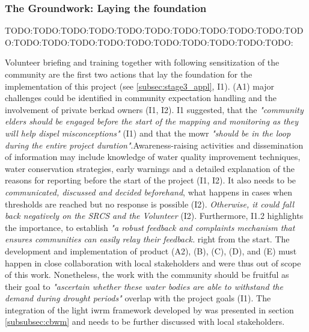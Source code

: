 \subsubsection{The Groundwork: Laying the foundation}
TODO:TODO:TODO:TODO:TODO:TODO:TODO:TODO:TODO:TODO:TODO:TODO:TODO:TODO:TODO:TODO:TODO:TODO:TODO:TODO:TODO:

Volunteer briefing and training together with following sensitization of the community are the first two actions that lay the foundation for the implementation of this project (see \ref*{subsec:stage3_appl}, I1). (A1) major challenges could be identified in community expectation handling and the involvement of private berkad owners (I1, I2). I1 suggested, that the \textit{"community elders should be engaged before the start of the mapping and monitoring as they will help dispel misconceptions"} (I1) and that the \acrshort{mowr} \textit{"should be in the loop during the entire project duration"}.Awareness-raising activities and dissemination of information may include knowledge of water quality improvement techniques, water conservation strategies, early warnings and a detailed explanation of the reasons for reporting before the start of the project (I1, I2). It also needs to be \textit{communicated, discussed and decided beforehand},  what happens in cases when thresholds are reached but no response is possible (I2). \textit{Otherwise, it could fall back negatively on the SRCS and the Volunteer} (I2). Furthermore, I1.2 highlights the importance, to establish \textit{"a robust feedback and complaints mechanism that ensures communities can easily relay their feedback.} right from the start. The development and implementation of product (A2), (B), (C), (D), and (E) must happen in close collaboration with local stakeholders and were thus out of scope of this work. Nonetheless, the work with the community should be fruitful as their goal to \textit{"ascertain whether these water bodies are able to withstand the demand during drought periods"} overlap with the project goals (I1).\newline
The integration of the light \acrshort{iwrm} framework developed by \autocite{dayCommunitybasedWaterResources2009} was presented in section \ref*{subsubsec:cbwm} and needs to be further discussed with local stakeholders.



